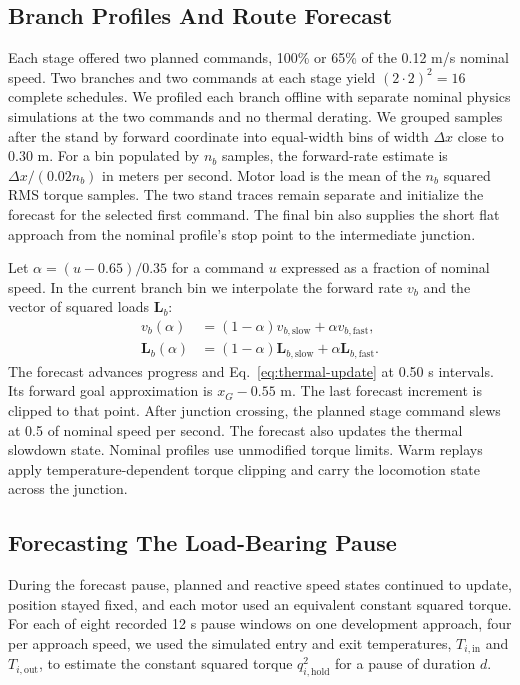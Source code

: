 \documentclass{ieeeaccess}
\begin{document}
\subsection{Branch Profiles And Route Forecast}
\label{subsec:forecast}

Each stage offered two planned commands, 100\% or 65\% of the 0.12 m/s nominal speed. Two branches and two commands at each stage yield $(2\cdot2)^2=16$ complete schedules. We profiled each branch offline with separate nominal physics simulations at the two commands and no thermal derating. We grouped samples after the stand by forward coordinate into equal-width bins of width $\Delta x$ close to 0.30 m. For a bin populated by $n_b$ samples, the forward-rate estimate is $\Delta x/(0.02 n_b)$ in meters per second. Motor load is the mean of the $n_b$ squared RMS torque samples. The two stand traces remain separate and initialize the forecast for the selected first command. The final bin also supplies the short flat approach from the nominal profile's stop point to the intermediate junction.

Let $\alpha=(u-0.65)/0.35$ for a command $u$ expressed as a fraction of nominal speed. In the current branch bin we interpolate the forward rate $v_b$ and the vector of squared loads $\mathbf{L}_b$:
\begin{align}
 v_b(\alpha)&=(1-\alpha)v_{b,\mathrm{slow}}+\alpha v_{b,\mathrm{fast}},\\
 \mathbf{L}_b(\alpha)&=(1-\alpha)\mathbf{L}_{b,\mathrm{slow}}
                        +\alpha\mathbf{L}_{b,\mathrm{fast}} .
\end{align}
The forecast advances progress and Eq.~\eqref{eq:thermal-update} at 0.50 s intervals. Its forward goal approximation is $x_G-0.55$ m. The last forecast increment is clipped to that point. After junction crossing, the planned stage command slews at 0.5 of nominal speed per second. The forecast also updates the thermal slowdown state. Nominal profiles use unmodified torque limits. Warm replays apply temperature-dependent torque clipping and carry the locomotion state across the junction.

\subsection{Forecasting The Load-Bearing Pause}

During the forecast pause, planned and reactive speed states continued to update, position stayed fixed, and each motor used an equivalent constant squared torque. For each of eight recorded 12 s pause windows on one development approach, four per approach speed, we used the simulated entry and exit temperatures, $T_{i,\mathrm{in}}$ and $T_{i,\mathrm{out}}$, to estimate the constant squared torque $q_{i,\mathrm{hold}}^2$ for a pause of duration $d$.
\end{document}
